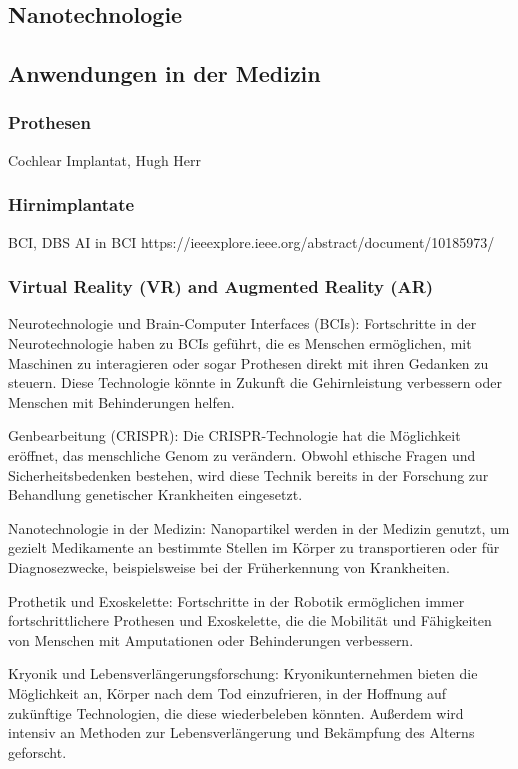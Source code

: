 \documentclass[a4paper,
DIV=13,
12pt,
BCOR=10mm,
department=FakEI,
twoside,
parskip=half,
automark,
]{OTHRartcl}
\begin{document}
\subsection*{Nanotechnologie}

\subsection*{Anwendungen in der Medizin}
\subsubsection*{Prothesen}
Cochlear Implantat, Hugh Herr
\subsubsection*{Hirnimplantate}
BCI, DBS
AI in BCI
https://ieeexplore.ieee.org/abstract/document/10185973/
\subsubsection*{Virtual Reality (VR) and Augmented Reality (AR)}


Neurotechnologie und Brain-Computer Interfaces (BCIs): Fortschritte in der Neurotechnologie haben zu BCIs geführt, die es Menschen ermöglichen, mit Maschinen zu interagieren oder sogar Prothesen direkt mit ihren Gedanken zu steuern. Diese Technologie könnte in Zukunft die Gehirnleistung verbessern oder Menschen mit Behinderungen helfen.

Genbearbeitung (CRISPR): Die CRISPR-Technologie hat die Möglichkeit eröffnet, das menschliche Genom zu verändern. Obwohl ethische Fragen und Sicherheitsbedenken bestehen, wird diese Technik bereits in der Forschung zur Behandlung genetischer Krankheiten eingesetzt.

Nanotechnologie in der Medizin: Nanopartikel werden in der Medizin genutzt, um gezielt Medikamente an bestimmte Stellen im Körper zu transportieren oder für Diagnosezwecke, beispielsweise bei der Früherkennung von Krankheiten.

Prothetik und Exoskelette: Fortschritte in der Robotik ermöglichen immer fortschrittlichere Prothesen und Exoskelette, die die Mobilität und Fähigkeiten von Menschen mit Amputationen oder Behinderungen verbessern.

Kryonik und Lebensverlängerungsforschung: Kryonikunternehmen bieten die Möglichkeit an, Körper nach dem Tod einzufrieren, in der Hoffnung auf zukünftige Technologien, die diese wiederbeleben könnten. Außerdem wird intensiv an Methoden zur Lebensverlängerung und Bekämpfung des Alterns geforscht.
\end{document}
